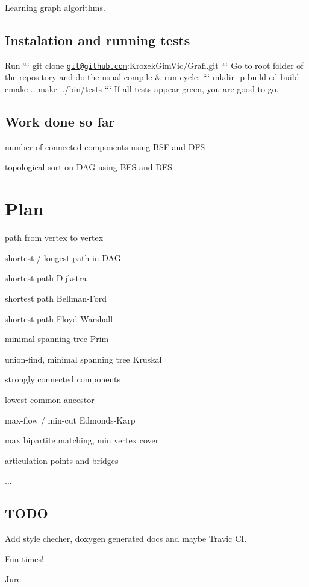 Learning graph algorithms.

\subsection*{Instalation and running tests}

Run ``` git clone \href{mailto:git@github.com}{\tt git@github.\-com}\-:Krozek\-Gim\-Vic/\-Grafi.\-git ``` Go to root folder of the repository and do the usual compile \& run cycle\-: ``` mkdir -\/p build cd build cmake .. make ../bin/tests ``` If all tests appear green, you are good to go.

\subsection*{Work done so far}


\begin{DoxyItemize}
\item number of connected components using B\-S\-F and D\-F\-S
\item topological sort on D\-A\-G using B\-F\-S and D\-F\-S
\end{DoxyItemize}

\section*{Plan}


\begin{DoxyItemize}
\item path from vertex to vertex
\item shortest / longest path in D\-A\-G
\item shortest path Dijkstra
\item shortest path Bellman-\/\-Ford
\item shortest path Floyd-\/\-Warshall
\item minimal spanning tree Prim
\item union-\/find, minimal spanning tree Kruskal
\item strongly connected components
\item lowest common ancestor
\item max-\/flow / min-\/cut Edmonds-\/\-Karp
\item max bipartite matching, min vertex cover
\item articulation points and bridges
\item ...
\end{DoxyItemize}

\subsection*{T\-O\-D\-O}

Add style checher, doxygen generated docs and maybe Travic C\-I.

Fun times!

Jure 